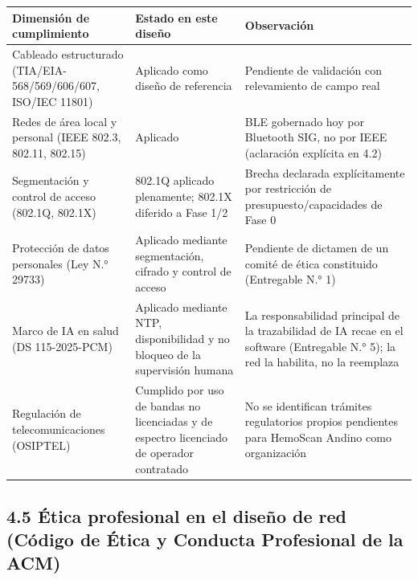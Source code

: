 \documentclass[11pt,a4paper]{article}
\begin{document}
{\small
\begin{longtable}[]{@{}
  >{\raggedright\arraybackslash}p{}
  >{\raggedright\arraybackslash}p{}
  >{\raggedright\arraybackslash}p{}@{}}
\toprule\noalign{}
\begin{minipage}[b]{\linewidth}\raggedright
Dimensión de cumplimiento
\end{minipage} & \begin{minipage}[b]{\linewidth}\raggedright
Estado en este diseño
\end{minipage} & \begin{minipage}[b]{\linewidth}\raggedright
Observación
\end{minipage} \\
\midrule\noalign{}
\endhead
\bottomrule\noalign{}
\endlastfoot
Cableado estructurado (TIA/EIA-568/569/606/607, ISO/IEC 11801) & Aplicado como diseño de referencia & Pendiente de validación con relevamiento de campo real \\
Redes de área local y personal (IEEE 802.3, 802.11, 802.15) & Aplicado & BLE gobernado hoy por Bluetooth SIG, no por IEEE (aclaración explícita en 4.2) \\
Segmentación y control de acceso (802.1Q, 802.1X) & 802.1Q aplicado plenamente; 802.1X diferido a Fase 1/2 & Brecha declarada explícitamente por restricción de presupuesto/capacidades de Fase 0 \\
Protección de datos personales (Ley N.° 29733) & Aplicado mediante segmentación, cifrado y control de acceso & Pendiente de dictamen de un comité de ética constituido (Entregable N.° 1) \\
Marco de IA en salud (DS 115-2025-PCM) & Aplicado mediante NTP, disponibilidad y no bloqueo de la supervisión humana & La responsabilidad principal de la trazabilidad de IA recae en el software (Entregable N.° 5); la red la habilita, no la reemplaza \\
Regulación de telecomunicaciones (OSIPTEL) & Cumplido por uso de bandas no licenciadas y de espectro licenciado de operador contratado & No se identifican trámites regulatorios propios pendientes para HemoScan Andino como organización \\
\end{longtable}
}

\subsection{4.5 Ética profesional en el diseño de red (Código de Ética y Conducta Profesional de la ACM)}\label{uxe9tica-profesional-en-el-diseuxf1o-de-red-cuxf3digo-de-uxe9tica-y-conducta-profesional-de-la-acm}
\end{document}
